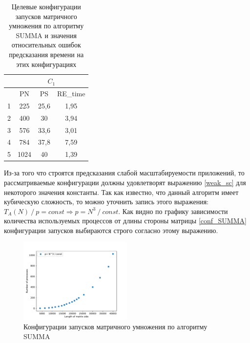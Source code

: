 		\begin{table}
			\centering
			\begin{tabular}{|r|c|c|c|}
			\hline
			            & \multicolumn{3}{|c|}{\(C_1\)} \\ \hline
			\textnumero & PN   & PS   & RE\_time        \\ \hline
			1           & 225  & 25,6 & 1,95            \\ \hline
			2           & 400  & 30   & 3,94            \\ \hline
			3           & 576  & 33,6 & 3,01            \\ \hline
			4           & 784  & 37,8 & 7,59            \\ \hline
			5           & 1024 & 40   & 1,39            \\ \hline
			\end{tabular}
			\caption{Целевые конфигурации запусков матричного умножения по алгоритму SUMMA и значения относительных ошибок предсказания времени на этих конфигурациях}
			\label{target_SUMMA}
		\end{table}
		Из-за того что строятся предсказания слабой масштабируемости приложений, то рассматриваемые конфигурации должны удовлетворят выражению \eqref{weak_sc} для некоторого значения константы. Так как известно, что данный алгоритм имеет кубическую сложность, то можно уточнить запись этого выражения: \(T_A(N)\:/\:p = const \Rightarrow p = N^3\:/\:const\). Как видно по графику зависимости количества используемых процессов от длины стороны матрицы \eqref{conf_SUMMA} конфигурации запусков выбираются строго согласно этому выражению.

		\begin{figure}
			\centering
			\includegraphics[width=0.5\textwidth]{./images/conf_SUMMA}
			\caption{Конфигурации запусков матричного умножения по алгоритму SUMMA}
			\label{conf_SUMMA}
		\end{figure}

